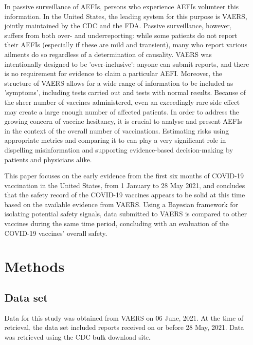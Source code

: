 \documentclass[12pt]{article}
\begin{document}
In passive surveillance of AEFIs, persons who experience AEFIs volunteer this information. In the United States, the leading system for this purpose is VAERS, jointly maintained by the CDC and the FDA. Passive surveillance, however, suffers from both over- and underreporting: while some patients do not report their AEFIs (especially if these are mild and transient), many who report various ailments do so regardless of a determination of causality. VAERS was intentionally designed to be 'over-inclusive': anyone can submit reports, and there is no requirement for evidence to claim a particular AEFI. Moreover, the structure of VAERS allows for a wide range of information to be included as 'symptoms', including tests carried out and tests with normal results. Because of the sheer number of vaccines administered, even an exceedingly rare side effect may create a large enough number of affected patients. In order to address the growing concern of vaccine hesitancy,\cite{khubchandani2021covid,peretti2020future,razai2021covid} it is crucial to analyse and present AEFIs in the context of the overall number of vaccinations. Estimating risks using appropriate metrics and comparing it to can play a very significant role in dispelling misinformation and supporting evidence-based decision-making by patients and physicians alike.

This paper focuses on the early evidence from the first six months of COVID-19 vaccination in the United States, from 1 January to 28 May 2021, and concludes that the safety record of the COVID-19 vaccines appears to be solid at this time based on the available evidence from VAERS. Using a Bayesian framework for isolating potential safety signals, data submitted to VAERS is compared to other vaccines during the same time period, concluding with an evaluation of the COVID-19 vaccines' overall safety.


\section{Methods} %
\label{sec:methods}

\subsection{Data set} %
\label{sub:data_set}

Data for this study was obtained from VAERS on 06 June, 2021. At the time of retrieval, the data set included reports received on or before 28 May, 2021. Data was retrieved using the CDC bulk download site.
\end{document}
